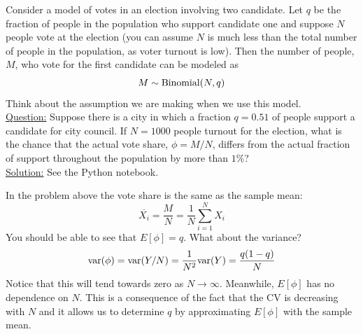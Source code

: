  
 \begin{example}
 Consider a model of votes in an election involving two candidate. Let $q$ be the fraction of people in the population who support candidate one and suppose $N$ people vote at the election (you can assume $N$ is much less than the total number of people in the population, as voter turnout is low). Then the number of people, $M$, who vote for the first candidate can be modeled as 
\begin{equation*}
M \sim {\rm Binomial}(N,q)
\end{equation*}
Think about the assumption we are making when we use this model. \\

 \noindent
\underline{Question:} Suppose there is a city in which a fraction $q = 0.51$ of people support a candidate for city council. If $N=1000$ people turnout for the election, what is the chance that the actual vote share, $\phi = M/N$, differs from the actual fraction of support throughout the population by more than $1\%$?\\

 \noindent
\underline{Solution:} See the Python notebook.
\end{example}

 In the problem above the vote share is the same as the sample mean:
\begin{equation*}
\overline{X_i} = \frac{M}{N} =  \frac{1}{N}\sum_{i=1}^NX_i
\end{equation*}
You should be able to see that $E[\phi] = q$. What about the variance? 
 \begin{equation*}
{\rm var}(\phi) = {\rm var}(Y/N) = \frac{1}{N^2}{\rm var}(Y) = \frac{q(1-q)}{N}
 \end{equation*}
 Notice that this will tend towards zero as $N \to \infty$. Meanwhile, $E[\phi]$ has no dependence on $N$. This is a consequence of the fact that the CV is decreasing with $N$ and it allows us to determine $q$ by approximating $E[\phi]$ with the sample mean.








